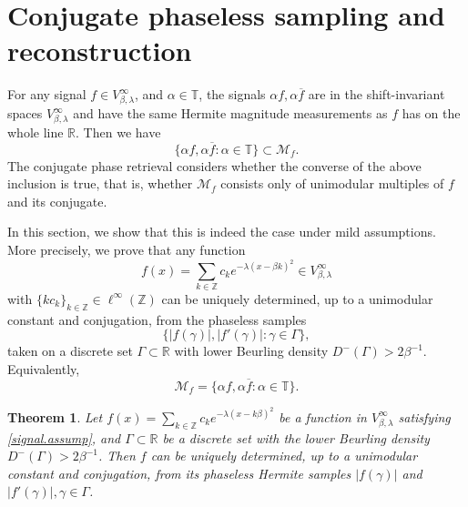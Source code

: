 \documentclass[11pt,oneside,reqno]{amsart}
\newtheorem{thm}{Theorem}[section]
\numberwithin{equation}{section}
\def\R{ {\mathbb R} }
\def\Z{ {\mathbb Z} }
\def\T{ {\mathbb T} }
\def\Vbeta{V^\infty_{\beta,\lambda}}
\begin{document}
%
%

\medskip
\section{Conjugate phaseless sampling and reconstruction}\label{cpr.sec}

\medskip


 For any signal  $f\in \Vbeta$, and   $\alpha \in\T$,  the signals $\alpha f, \alpha \overline{f}$ are in the shift-invariant spaces $\Vbeta$  and have the same Hermite magnitude measurements  as $f$ has on the whole line $\R$. Then we have %
$$\{\alpha f, \alpha \overline{f}:\alpha\in \mathbb T\} \subset {\mathcal M}_f. $$
The conjugate phase retrieval considers whether the converse of the above inclusion is true, that is, whether $\mathcal{M}_f$ consists only of unimodular multiples of $f$ and its conjugate. 

In this section, we show that this is indeed the case under mild assumptions. More precisely, we prove that any function
\[
f(x)=\sum_{k\in\Z} c_k e^{-\lambda(x-\beta k)^2}\in \Vbeta
\]
with $\{k c_k\}_{k\in\Z}\in\ell^\infty(\Z)$ can be uniquely determined, up to a unimodular constant and conjugation, from the phaseless samples
\[
\{|f(\gamma)|, |f'(\gamma)|:\gamma\in\Gamma\},
\]
taken on a discrete set $\Gamma\subset\R$ with lower Beurling density $D^-(\Gamma)> 2\beta^{-1}$. Equivalently,
\begin{equation}\label{cpr.def}
\mathcal{M}_f=\{\alpha f, \alpha\overline{f}: \alpha \in\T\}.
\end{equation}




\begin{thm}\label{main.thm}
{\rm Let  $f(x)=\sum_{k\in\Z}c_ke^{-\lambda(x-k\beta)^2}$ be a function in $\Vbeta$ satisfying \eqref{signal.assump}, and   $\Gamma\subset \R$ be a  discrete set with the lower Beurling density $D^-(\Gamma)>2\beta^{-1}$. 
 Then $f$
  can be uniquely determined, up to a unimodular constant and conjugation, from its phaseless Hermite samples $|f(\gamma)|$ and $|f'(\gamma)|, \gamma\in \Gamma$.}
\end{thm}
\end{document}
